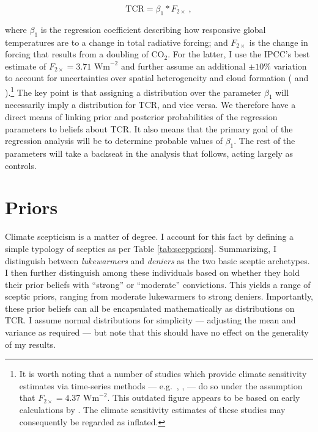 \documentclass[smallextended]{svjour3}       %
\begin{document}
\begin{equation}
   \text{TCR} = \beta_1 * F_{2\times}\ , \label{eq:impliedtcr}
\end{equation}

where \(\beta_1\) is the regression coefficient describing how
responsive global temperatures are to a change in total radiative
forcing; and \(F_{2\times}\) is the change in forcing that results from
a doubling of CO\(_2\). For the latter, I use the IPCC's best estimate
of \(F_{2\times}=3.71 \text{ Wm}^{-2}\) and further assume an additional
\(\pm10\%\) variation to account for uncertainties over spatial
heterogeneity and cloud formation (\cite{schmidt2007co2} and
\cite{ipcc2001i}).\footnote{It is worth noting that a number of studies
  which provide climate sensitivity estimates via time-series methods
  --- e.g.~\cite{kaufmann2006emissions}, \cite{mills2009robust},
  \cite{estrada2012breaks} --- do so under the assumption that
  \(F_{2\times}=4.37 \text{ Wm}^{-2}\). This outdated figure appears to
  be based on early calculations by \cite{hansen1988global}. The climate
  sensitivity estimates of these studies may consequently be regarded as
  inflated.} The key point is that assigning a distribution over the
parameter \(\beta_1\) will necessarily imply a distribution for TCR, and
vice versa. We therefore have a direct means of linking prior and
posterior probabilities of the regression parameters to beliefs about
TCR. It also means that the primary goal of the regression analysis will
be to determine probable values of \(\beta_1\). The rest of the
parameters will take a backseat in the analysis that follows, acting
largely as controls.

\hypertarget{sec:priors}{%
\section{Priors}\label{sec:priors}}

Climate scepticism is a matter of degree. I account for this fact by
defining a simple typology of sceptics as per Table
\ref{tab:sceppriors}. Summarizing, I distinguish between
\textit{lukewarmers} and \textit{deniers} as the two basic sceptic
archetypes. I then further distinguish among these individuals based on
whether they hold their prior beliefs with ``strong'' or ``moderate''
convictions. This yields a range of sceptic priors, ranging from
moderate lukewarmers to strong deniers. Importantly, these prior beliefs
can all be encapsulated mathematically as distributions on TCR. I assume
normal distributions for simplicity --- adjusting the mean and variance
as required --- but note that this should have no effect on the
generality of my results.
\end{document}
